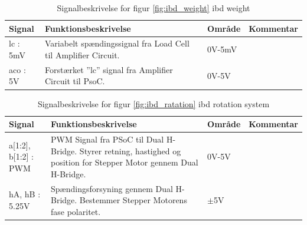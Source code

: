 \begin{table}[H] 
	\centering 
	\begin{tabular}{|p{2cm}|p{6cm}|p{2cm}|p{3cm}|}
		\hline
\textbf{Signal} & \textbf{Funktionsbeskrivelse}  & \textbf{Område} &  \textbf{Kommentar}  \\ \hline
lc : 5mV & Variabelt spændingssignal fra Load Cell til Amplifier Circuit. & 0V-5mV &  \\ \hline
aco : 5V & Forstærket ”lc” signal fra Amplifier Circuit til PsoC. & 0V-5V &  \\ \hline
	\end{tabular}
	\caption{Signalbeskrivelse for figur \ref{fig:ibd_weight} ibd weight}
	\label{tab:signalbeskrivelse_weight}
\end{table}
\FloatBarrier

\begin{table}[H] 
	\centering 
	\begin{tabular}{|p{2cm}|p{6cm}|p{2cm}|p{3cm}|}
		\hline
\textbf{Signal} & \textbf{Funktionsbeskrivelse}  & \textbf{Område} &  \textbf{Kommentar}  \\ \hline
a[1:2], b[1:2] : PWM & PWM Signal fra PSoC til Dual H-Bridge. Styrer retning, hastighed og position for Stepper Motor gennem Dual H-Bridge. & 0V-5V &  \\ \hline
hA, hB : 5.25V & Spændingsforsyning gennem Dual H-Bridge. Bestemmer Stepper Motorens fase polaritet. & $\pm$5V &  \\ \hline
	\end{tabular}
	\caption{Signalbeskrivelse for figur \ref{fig:ibd_ratation} ibd rotation system}
	\label{tab:signalbeskrivelse_rotation}
\end{table}
\FloatBarrier